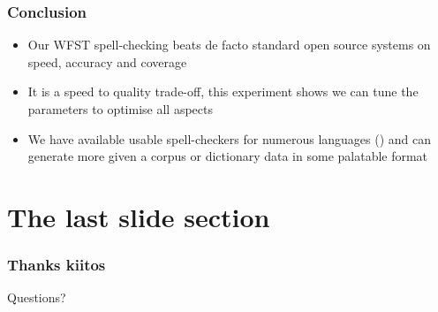\documentclass[t,12pt]{beamer}
\begin{document}
\begin{frame}
    \frametitle{Conclusion}
    \begin{itemize}
        \item Our WFST spell-checking beats de facto standard open source
            systems on speed, accuracy and coverage
        \item It is a speed to quality trade-off, this experiment shows we can
            tune the parameters to optimise all aspects
        \item We have available usable spell-checkers for numerous languages
        (\hyperlink{links}{})
            and can generate more given a corpus or dictionary data in some
            palatable format
    \end{itemize}
\end{frame}

\section{The last slide section}

\begin{frame}
    \frametitle{Thanks kiitos }
    Questions?
\end{frame}
\end{document}
